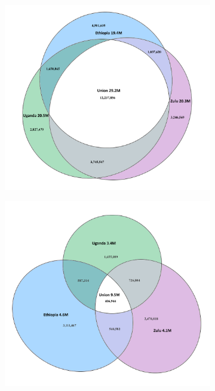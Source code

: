 \begin{figure}[htp]
  \centering
  \begin{subfigure}[b]{0.45\textwidth}
    \includegraphics[width=\textwidth]{fig/venn3.png}
    \caption{}
  \end{subfigure}
  \begin{subfigure}[b]{0.45\textwidth}
    \includegraphics[width=\textwidth]{fig/venn3_complement.png}

\end{subfigure}
\end{figure}
